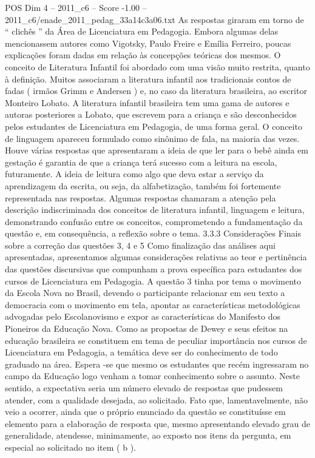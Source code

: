 \begin{textsample}{POS Dim 4 – 2011\_c6 – Score -1.00 – 2011\_c6/enade\_2011\_pedag\_33a14c3a06.txt}
As respostas giraram em torno de “ clichês ” da Área de Licenciatura em Pedagogia.
Embora algumas delas mencionassem autores como Vigotsky, Paulo Freire e Emília Ferreiro, poucas explicações foram dadas em relação às concepções teóricas dos mesmos.
O conceito de Literatura Infantil foi abordado com uma visão muito restrita, quanto à definição.
Muitos associaram a literatura infantil aos tradicionais contos de fadas ( irmãos Grimm e Andersen ) e, no caso da literatura brasileira, ao escritor Monteiro Lobato.
A literatura infantil brasileira tem uma gama de autores e autoras posteriores a Lobato, que escrevem para a criança e são desconhecidos pelos estudantes de Licenciatura em Pedagogia, de uma forma geral.
O conceito de linguagem apareceu formulado como sinônimo de fala, na maioria das vezes.
Houve várias respostas que apresentaram a ideia de que ler para o bebê ainda em gestação é garantia de que a criança terá sucesso com a leitura na escola, futuramente.
A ideia de leitura como algo que deva estar a serviço da aprendizagem da escrita, ou seja, da alfabetização, também foi fortemente representada nas respostas.
Algumas respostas chamaram a atenção pela descrição indiscriminada dos conceitos de literatura infantil, linguagem e leitura, demonstrando confusão entre os conceitos, comprometendo a fundamentação da questão e, em consequência, a reflexão sobre o tema. 3.3.3 Considerações Finais sobre a correção das questões 3, 4 e 5 Como finalização das análises aqui apresentadas, apresentamos algumas considerações relativas ao teor e pertinência das questões discursivas que compunham a prova específica para estudantes dos cursos de Licenciatura em Pedagogia.
A questão 3 tinha por tema o movimento da Escola Nova no Brasil, devendo o participante relacionar em seu texto a democracia com o movimento em tela, apontar as características metodológicas advogadas pelo Escolanovismo e expor as características do Manifesto dos Pioneiros da Educação Nova.
Como as propostas de Dewey e seus efeitos na educação brasileira se constituem em tema de peculiar importância nos cursos de Licenciatura em Pedagogia, a temática deve ser do conhecimento de todo graduado na área.
Espera -se que mesmo os estudantes que recém ingressaram no campo da Educação logo venham a tomar conhecimento sobre o assunto.
Neste sentido, a expectativa seria um número elevado de respostas que pudessem atender, com a qualidade desejada, ao solicitado.
Fato que, lamentavelmente, não veio a ocorrer, ainda que o próprio enunciado da questão se constituísse em elemento para a elaboração de resposta que, mesmo apresentando elevado grau de generalidade, atendesse, minimamente, ao exposto nos itens da pergunta, em especial ao solicitado no item ( b ).

\end{textsample}
